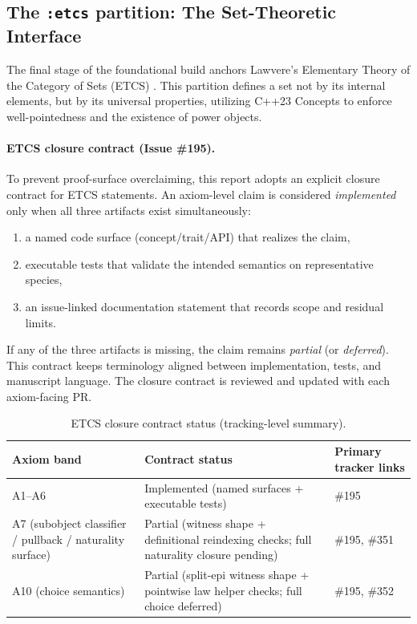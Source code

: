\documentclass[11pt, a4paper]{report}
\begin{document}
\subsection{The \texttt{:etcs} partition: The Set-Theoretic Interface}
The final stage of the foundational build anchors Lawvere's Elementary Theory of the Category of Sets (ETCS) \cite{lawvere1964etcs}. This partition defines a set not by its internal elements, but by its universal properties, utilizing C++23 Concepts to enforce well-pointedness and the existence of power objects.

\paragraph{ETCS closure contract (Issue \#195).}
To prevent proof-surface overclaiming, this report adopts an explicit closure contract for ETCS statements.
An axiom-level claim is considered \emph{implemented} only when all three artifacts exist simultaneously:
\begin{enumerate}
  \item a named code surface (concept/trait/API) that realizes the claim,
  \item executable tests that validate the intended semantics on representative species,
  \item an issue-linked documentation statement that records scope and residual limits.
\end{enumerate}
If any of the three artifacts is missing, the claim remains \emph{partial} (or \emph{deferred}).
This contract keeps terminology aligned between implementation, tests, and manuscript language. The closure contract is reviewed and updated with each axiom-facing PR.

\begin{table}[ht]
\centering
\caption{ETCS closure contract status (tracking-level summary).}
\label{table:etcs-closure-contract}
\begin{tabular}{lll}
\toprule
\textbf{Axiom band} & \textbf{Contract status} & \textbf{Primary tracker links} \\
\midrule
A1--A6 & Implemented (named surfaces + executable tests) & \#195 \\
A7 (subobject classifier / pullback / naturality surface) & Partial (witness shape + definitional reindexing checks; full naturality closure pending) & \#195, \#351 \\
A10 (choice semantics) & Partial (split-epi witness shape + pointwise law helper checks; full choice deferred) & \#195, \#352 \\
\bottomrule
\end{tabular}
\end{table}
\end{document}
